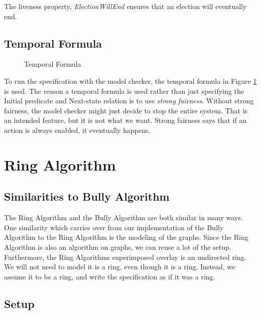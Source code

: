 \documentclass{report}
\begin{document}
The liveness property, \textit{ElectionWillEnd} ensures that an election will eventually end.

\section{Temporal Formula}

\begin{figure}
\tlatex

\@x{}\moduleLeftDash{}\moduleRightDash\@xx{}%


\@x{}\bottombar\@xx{}%

\caption{Temporal Formula}
\label{bullyspec}
\end{figure}


To run the specification with the model checker, the temporal formula in Figure \ref{bullyspec} is used. The reason a temporal formula is used rather than just specifying the Initial predicate and Next-state relation is to use \textit{strong fairness}. Without strong fairness, the model checker might just decide to stop the entire system. That is an intended feature, but it is not what we want. Strong fairness says that if an action is always enabled, it eventually happens.


\chapter{Ring Algorithm}


\section{Similarities to Bully Algorithm}
The Ring Algorithm and the Bully Algorithm are both similar in many ways. One similarity which carries over from our implementation of the Bully Algorithm to the Ring Algorithm is the modeling of the graphs. Since the Ring Algorithm is also an algorithm on graphs, we can reuse a lot of the setup. Furthermore, the Ring Algorithms superimposed overlay is an undirected ring. We will not need to model it is a ring, even though it is a ring. Instead, we assume it to be a ring, and write the specification as if it was a ring.


\section{Setup}
\end{document}
